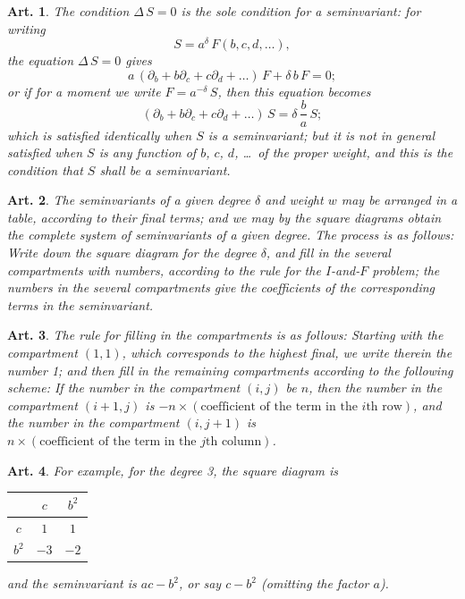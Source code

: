 \documentclass[11pt,a4paper]{article}
\theoremstyle{cayley}
\newtheorem{art}{Art.}[section]
\begin{document}
\setcounter{art}{36}
\begin{art}
The condition $\Delta\,S = 0$ is the sole condition for a seminvariant: for writing
\[
S = a^{\delta}\,F(b, c, d, \ldots),
\]
the equation $\Delta\,S = 0$ gives
\[
a\,(\partial_{b} + b\partial_{c} + c\partial_{d} + \ldots)\,F + \delta\,b\,F = 0;
\]
or if for a moment we write $F = a^{-\delta}\,S$, then this equation becomes
\[
(\partial_{b} + b\partial_{c} + c\partial_{d} + \ldots)\,S = \delta\,\frac{b}{a}\,S;
\]
which is satisfied identically when $S$ is a seminvariant; but it is not in general satisfied when $S$ is any function of $b$, $c$, $d$, \ldots\ of the proper weight, and this is the condition that $S$ shall be a seminvariant.
\end{art}

\setcounter{art}{37}
\begin{art}
The seminvariants of a given degree $\delta$ and weight $w$ may be arranged in a table, according to their final terms; and we may by the square diagrams obtain the complete system of seminvariants of a given degree. The process is as follows: Write down the square diagram for the degree $\delta$, and fill in the several compartments with numbers, according to the rule for the $I$-and-$F$ problem; the numbers in the several compartments give the coefficients of the corresponding terms in the seminvariant.
\end{art}

\setcounter{art}{38}
\begin{art}
The rule for filling in the compartments is as follows: Starting with the compartment $(1, 1)$, which corresponds to the highest final, we write therein the number 1; and then fill in the remaining compartments according to the following scheme: If the number in the compartment $(i, j)$ be $n$, then the number in the compartment $(i + 1, j)$ is $-n \times (\text{coefficient of the term in the $i$th row})$, and the number in the compartment $(i, j + 1)$ is $n \times (\text{coefficient of the term in the $j$th column})$.
\end{art}

\setcounter{art}{39}
\begin{art}
For example, for the degree 3, the square diagram is
\begin{center}
\begin{tabular}{c|cc}
 & $c$ & $b^{2}$ \\
\hline
$c$ & $1$ & $1$ \\
$b^{2}$ & $-3$ & $-2$ \\
\end{tabular}
\end{center}
and the seminvariant is $ac - b^{2}$, or say $c - b^{2}$ (omitting the factor $a$).
\end{art}
\end{document}
